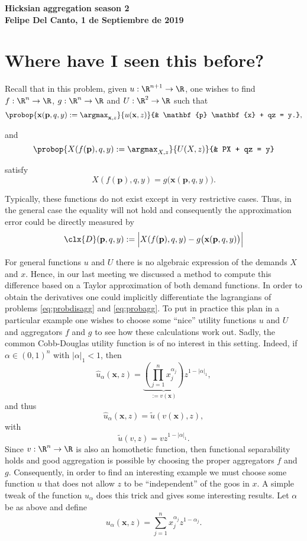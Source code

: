 \documentclass[english, a4paper,12pt]{article}
\begin{document}
\begin{center} \bf \large
	Hicksian aggregation season 2 \\ Felipe Del Canto, 1 de Septiembre de 2019
\end{center}

\section{Where have I seen this before?}
Recall that in this problem, given $u : \R^{n+1} \to \R$, one wishes to find $f: \R^{n} \to \R$, $g: \R^{n} \to \R$ and $U: \R^{2} \to \R$ such that
	\begin{equation} \label{eq:probdisagg}
		\probop{\mathbf{x}(\mathbf{p}, q, y) 
			:= \argmax_{\mathbf{x}, z}}{u(\mathbf{x}, z)}
				{&	\mathbf{p} \mathbf{x} + qz = y.},
	\end{equation} 

and
	\begin{equation} \label{eq:probagg}
		\probop{X(f(\mathbf{p}), q, y) := \argmax_{X, z}}{U(X,z)}
										{&	PX + qz = y}
	\end{equation}

satisfy
	$$X(f(\mathbf{p}), q, y) = g\big(\mathbf{x}(\mathbf{p}, q, y)\big).$$
 
Typically, these functions do not exist except in very restrictive cases. Thus, in the general case the equality will not hold and consequently the approximation error could be directly measured by
	$$\clx{D}(\mathbf{p}, q,y) := \Big|X(f(\mathbf{p}), q, y) - g\big(\mathbf{x}(\mathbf{p}, q, y)\big)\Big|$$

For general functions $u$ and $U$ there is no algebraic expression of the demands $X$ and $x$. Hence, in our last meeting we discussed a method to compute this difference based on a Taylor approximation of both demand functions. In order to obtain the derivatives one could implicitly differentiate the lagrangians of problems \eqref{eq:probdisagg} and \eqref{eq:probagg}. To put in practice this plan in a particular example one wishes to choose some ``nice'' utility functions $u$ and $U$ and aggregators $f$ and $g$ to see how these calculations work out. Sadly, the common Cobb-Douglas utility function is of no interest in this setting. Indeed, if $\alpha \in (0,1)^{n}$ with $|\alpha|_{1} < 1$, then
	$$\hat{u}_{\alpha}(\mathbf{x}, z) = \underbrace{\left(\prod_{j=1}^{n} x_{j}^{\alpha_{j}}\right)}_{:= v(\mathbf{x})}z^{1-|\alpha|_{1}},$$
and thus
	$$\hat{u}_{\alpha}(\mathbf{x},z) = \tilde{u}(v(\mathbf{x}), z),$$
with
	$$\tilde{u}(v,z) = vz^{1-|\alpha|_{1}}.$$
Since $v: \R^{n} \to \R$ is also an homothetic function, then functional separability holds and good aggregation is possible by choosing the proper aggregators $f$ and $g$. Consequently, in order to find an interesting example we must choose some function $u$ that does not allow $z$ to be ``independent'' of the goos in $x$. A simple tweak of the function $u_{\alpha}$ does this trick and gives some interesting results. Let $\alpha$ be as above and define
	\begin{equation} \label{eq:sumCD}
		u_{\alpha}(\mathbf{x},z) = \sum_{j=1}^{n} x_{j}^{\alpha_{j}}z^{1-\alpha_{j}}.
	\end{equation}
\end{document}
